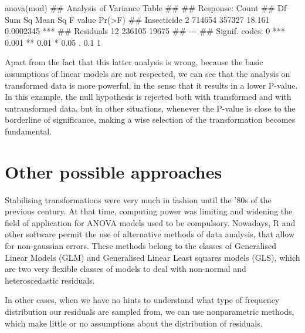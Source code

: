 \documentclass[a4paper,12pt,oneside]{book}
\newenvironment{Shaded}{\begin{snugshade}}{\end{snugshade}}
\newcommand{\DocumentationTok}[1]{#1}
\newcommand{\FunctionTok}[1]{#1}
\newcommand{\NormalTok}[1]{#1}
\begin{document}
\begin{Shaded}
\begin{Highlighting}[]
\FunctionTok{anova}\NormalTok{(mod)}
\DocumentationTok{\#\# Analysis of Variance Table}
\DocumentationTok{\#\# }
\DocumentationTok{\#\# Response: Count}
\DocumentationTok{\#\#             Df Sum Sq Mean Sq F value    Pr(\textgreater{}F)    }
\DocumentationTok{\#\# Insecticide  2 714654  357327  18.161 0.0002345 ***}
\DocumentationTok{\#\# Residuals   12 236105   19675                      }
\DocumentationTok{\#\# {-}{-}{-}}
\DocumentationTok{\#\# Signif. codes:  0 \textquotesingle{}***\textquotesingle{} 0.001 \textquotesingle{}**\textquotesingle{} 0.01 \textquotesingle{}*\textquotesingle{} 0.05 \textquotesingle{}.\textquotesingle{} 0.1 \textquotesingle{} \textquotesingle{} 1}
\end{Highlighting}
\end{Shaded}

Apart from the fact that this latter analysis is wrong, because the basic assumptions of linear models are not respected, we can see that the analysis on transformed data is more powerful, in the sense that it results in a lower P-value. In this example, the null hypothesis is rejected both with transformed and with untransformed data, but in other situations, whenever the P-value is close to the borderline of significance, making a wise selection of the transformation becomes fundamental.

\hypertarget{other-possible-approaches}{%
\section{Other possible approaches}\label{other-possible-approaches}}

Stabilising transformations were very much in fashion until the '80s of the previous century. At that time, computing power was limiting and widening the field of application for ANOVA models used to be compulsory. Nowadays, R and other software permit the use of alternative methods of data analysis, that allow for non-gaussian errors. These methods belong to the classes of Generalised Linear Models (GLM) and Generalised Linear Least squares models (GLS), which are two very flexible classes of models to deal with non-normal and heteroscedastic residuals.

In other cases, when we have no hints to understand what type of frequency distribution our residuals are sampled from, we can use nonparametric methods, which make little or no assumptions about the distribution of residuals.
\end{document}
